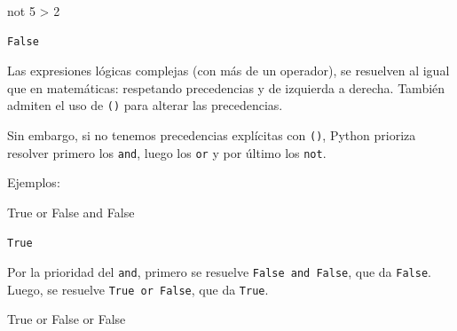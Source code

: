 \documentclass[
  letterpaper,
  DIV=11,
  numbers=noendperiod]{scrreprt}
\newenvironment{Shaded}{\begin{snugshade}}{\end{snugshade}}
\newcommand{\DecValTok}[1]{\textcolor[rgb]{0.68,0.00,0.00}{#1}}
\newcommand{\KeywordTok}[1]{\textcolor[rgb]{0.00,0.23,0.31}{#1}}
\newcommand{\OperatorTok}[1]{\textcolor[rgb]{0.37,0.37,0.37}{#1}}
\newcommand{\VariableTok}[1]{\textcolor[rgb]{0.07,0.07,0.07}{#1}}
\begin{document}
\begin{Shaded}
\begin{Highlighting}[]
\KeywordTok{not} \DecValTok{5} \OperatorTok{\textgreater{}} \DecValTok{2}
\end{Highlighting}
\end{Shaded}

\begin{verbatim}
False
\end{verbatim}

\begin{tcolorbox}[enhanced jigsaw, colframe=quarto-callout-caution-color-frame, opacityback=0, opacitybacktitle=0.6, bottomrule=.15mm, toprule=.15mm, coltitle=black, breakable, colback=white, leftrule=.75mm, titlerule=0mm, bottomtitle=1mm, toptitle=1mm, rightrule=.15mm, title=\textcolor{quarto-callout-caution-color}{\faFire}\hspace{0.5em}{Prioridad de Operadores}, arc=.35mm, left=2mm, colbacktitle=quarto-callout-caution-color!10!white]

Las expresiones lógicas complejas (con más de un operador), se resuelven
al igual que en matemáticas: respetando precedencias y de izquierda a
derecha. También admiten el uso de \texttt{()} para alterar las
precedencias.

Sin embargo, si no tenemos precedencias explícitas con \texttt{()},
Python prioriza resolver primero los \texttt{and}, luego los \texttt{or}
y por último los \texttt{not}.

Ejemplos:

\begin{Shaded}
\begin{Highlighting}[]
\VariableTok{True} \KeywordTok{or} \VariableTok{False} \KeywordTok{and} \VariableTok{False}
\end{Highlighting}
\end{Shaded}

\begin{verbatim}
True
\end{verbatim}

Por la prioridad del \texttt{and}, primero se resuelve
\texttt{False\ and\ False}, que da \texttt{False}. Luego, se resuelve
\texttt{True\ or\ False}, que da \texttt{True}.

\begin{Shaded}
\begin{Highlighting}[]
\VariableTok{True} \KeywordTok{or} \VariableTok{False} \KeywordTok{or} \VariableTok{False}
\end{Highlighting}
\end{Shaded}


\end{tcolorbox}
\end{document}
